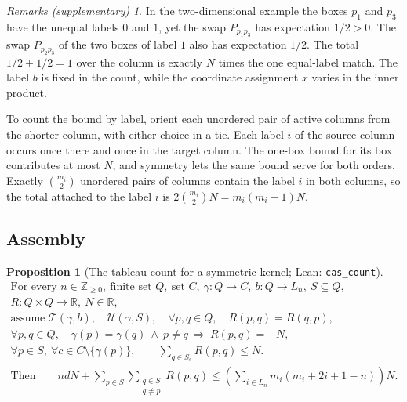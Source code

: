 \documentclass[11pt]{amsart}
\newcommand{\lean}[1]{\texttt{#1}}
\newcommand{\notlean}{supplementary}
\newtheorem{proposition}{Proposition}
\theoremstyle{definition}
\theoremstyle{remark}
\newtheorem*{remarks}{Remarks \textup{(\notlean)}}
\begin{document}
\begin{remarks}
In the two-dimensional example the boxes \(p_1\) and \(p_3\) have the unequal labels \(0\)
and \(1\), yet the swap \(P_{p_1p_3}\) has expectation \(1/2>0\). The swap
\(P_{p_2p_3}\) of the two boxes of label \(1\) also has expectation \(1/2\).
The total \(1/2+1/2=1\) over the column is exactly \(N\) times the one
equal-label match. The label \(b\) is fixed in the count, while the
coordinate assignment \(x\) varies in the inner product.

To count the bound by label, orient each unordered pair of
active columns from the shorter column, with either choice in a tie. Each
label \(i\) of the source column occurs once there and once in the target
column. The one-box bound for its box contributes at most \(N\), and symmetry
lets the same bound serve for both orders. Exactly \(\binom{m_i}{2}\)
unordered pairs of columns contain the label \(i\) in both columns, so the
total attached to the label \(i\) is \(2\binom{m_i}{2}N=m_i(m_i-1)N\).
\end{remarks}

\subsection{Assembly}

\begin{proposition}[The tableau count for a symmetric kernel; Lean: \lean{cas\_\allowbreak{}count}]\label{prop:9}
\[
\begin{gathered}
\text{For every }n\in\mathbb Z_{\ge0},\ \text{finite set }Q,\ \text{set }C,\
\gamma:Q\to C,\ b:Q\to L_n,\ S\subseteq Q,\\
R:Q\times Q\to\mathbb R,\ N\in\mathbb R,\\
\text{assume }\mathcal T(\gamma,b),\quad\mathcal U(\gamma,S),\quad
\forall p,q\in Q,\quad R(p,q)=R(q,p),\\
\forall p,q\in Q,\quad
\gamma(p)=\gamma(q)\ \land\ p\ne q\ \Longrightarrow\ R(p,q)=-N,\\
\forall p\in S,\ \forall c\in C\setminus\{\gamma(p)\},\qquad
\sum_{q\in S_c}R(p,q)\le N.
\\
\text{Then}\qquad
ndN+\sum_{p\in S}\sum_{\substack{q\in S\\q\ne p}}R(p,q)
\le \left(\sum_{i\in L_n}m_i(m_i+2i+1-n)\right)N.
\end{gathered}
\]
\end{proposition}
\end{document}
